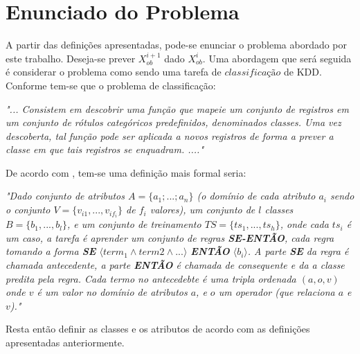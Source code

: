 \section{Enunciado do Problema}

A partir das definições apresentadas, pode-se enunciar o problema 
abordado por este trabalho. Deseja-se prever $X_{ob}^{i+1}$ dado
$X_{ob}^{i}$. Uma abordagem que será seguida é considerar
o problema como sendo uma tarefa de $classificação$ de KDD. Conforme
\cite{passos2005datamining} tem-se que o problema de classificação:

\begin{description}
  \item \textit{"... Consistem em descobrir uma função que mapeie um conjunto de
  registros em um conjunto de rótulos categóricos predefinidos, denominados
  classes. Uma vez descoberta, tal função pode ser aplicada a novos registros
  de forma a prever a classe em que tais registros se enquadram. ...."}
\end{description}

De acordo com \cite{doringo2004ant}, tem-se uma definição mais formal seria:
\begin{description}
  \item \textit{"Dado conjunto de atributos $A = \lbrace a_1 ; . . . ; a_n\rbrace$ 
  (o domínio de cada atributo $a_i$ sendo o conjunto $V = \lbrace v_{i1} , . . ., v_{if_i}\rbrace$ de $f_i$ valores),
  um conjunto de $l$ classes $B = \lbrace b_1 , . . . , b_l \rbrace$, e um conjunto de treinamento 
  $TS = \lbrace ts_1 , . . . , ts_h \rbrace $, onde cada $ts_i$ é um caso,
  a tarefa é aprender um conjunto de regras \textbf{SE-ENTÃO}, cada regra tomando a forma
  \textbf{SE} $\langle term_1 \wedge term2 \wedge...\rangle $ \textbf{ENTÃO} $\langle b_i \rangle$. 
  A parte \textbf{SE} da regra é chamada antecedente, a parte \textbf{ENTÃO} é chamada de
  consequente e da a classe predita pela regra. Cada termo no antecedebte é uma tripla ordenada
  $(a, o, v)$ onde $v$ é um valor no domínio de atributos $a$, e $o$ um operador (que relaciona $a$ e $v$)."}
\end{description}

Resta então definir as classes e os atributos de acordo com as definições apresentadas anteriormente.